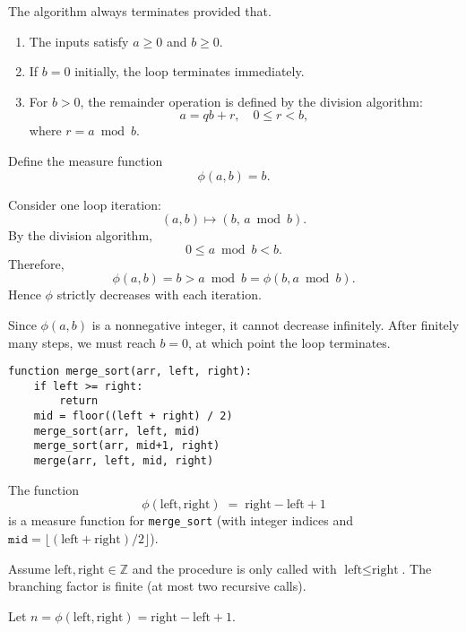 \documentclass{article}
\theoremstyle{theorem}
\theoremstyle{definition}
\theoremstyle{remark}
\begin{document}
The algorithm always terminates provided that.
\begin{enumerate}
    \item The inputs satisfy $a \geq 0$ and $b \geq 0$.
    \item If $b = 0$ initially, the loop terminates immediately.
    \item For $b > 0$, the remainder operation is defined by the division algorithm: 
    \[
    a = qb + r, \quad 0 \leq r < b,
    \]
    where $r = a \bmod b$.
\end{enumerate}

Define the measure function
\[
\phi(a,b) = b.
\]

Consider one loop iteration:
\[
(a,b) \mapsto (b,\, a \bmod b).
\]
By the division algorithm, 
\[
0 \leq a \bmod b < b.
\]
Therefore,
\[
\phi(a,b) = b > a \bmod b = \phi(b, a \bmod b).
\]
Hence $\phi$ strictly decreases with each iteration.

Since $\phi(a,b)$ is a nonnegative integer, it cannot decrease infinitely. After finitely many steps, we must reach $b = 0$, at which point the loop terminates.

\begin{verbatim}
function merge_sort(arr, left, right):
    if left >= right:
        return
    mid = floor((left + right) / 2)
    merge_sort(arr, left, mid)
    merge_sort(arr, mid+1, right)
    merge(arr, left, mid, right)
\end{verbatim}

The function
\[
\phi(\text{left},\text{right}) \;=\; \text{right} - \text{left} + 1
\]
is a measure function for \texttt{merge\_sort} (with integer indices and
\(\texttt{mid}=\lfloor ( \text{left}+\text{right})/2 \rfloor\)).

Assume \(\text{left},\text{right}\in\mathbb{Z}\) and the procedure is only called with
\(\text{left}\le \text{right}\). The branching factor is finite (at most two recursive calls).

Let \(n=\phi(\text{left},\text{right})=\text{right}-\text{left}+1\).
\end{document}
